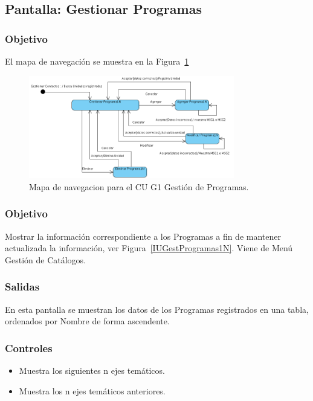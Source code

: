 \subsection{Pantalla: Gestionar Programas}
\subsubsection{Objetivo}
	El mapa de navegación se muestra en la Figura~\ref{fig:mapaNavegacionCUG1}

   \begin{figure}[hbpt!]
 		\centering
 			\includegraphics[width=0.8\textwidth]{images/CUG1/mapaNavegacion.png}
 		\caption{Mapa de navegacion para el CU G1 Gestión de Programas.}%
		\label{fig:mapaNavegacionCUG1}
 	\end{figure}

\subsubsection{Objetivo}
	Mostrar la información correspondiente a los Programas a fin de mantener actualizada la información, ver Figura~\ref{IUGestProgramas1N}. Viene de Menú Gestión de Catálogos.


\subsubsection{Salidas}

	En esta pantalla se muestran los datos de los Programas registrados en una tabla, ordenados por Nombre de forma ascendente.

\subsubsection{Controles}
\begin{itemize}
 \item {} Muestra los siguientes n ejes temáticos.
 \item {} Muestra los n ejes temáticos anteriores.
\end{itemize}

